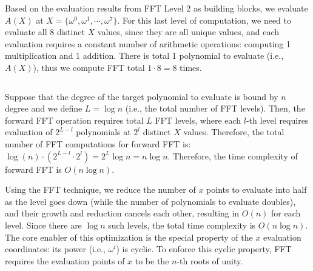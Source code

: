 $ $

 Based on the evaluation results from FFT Level 2 as building blocks, we evaluate $A(X)$ at $X = \{\omega^0, \omega^1, \cdots, \omega^7\}$. For this last level of computation, we need to evaluate all 8 distinct $X$ values, since they are all unique values, and each evaluation requires a constant number of arithmetic operations: computing 1 multiplication and 1 addition. There is total 1 polynomial to evaluate (i.e., $A(X)$), thus we compute FFT total $1 \cdot 8 = 8$ times. 

$ $

 Suppose that the degree of the target polynomial to evaluate is bound by $n$ degree and we define $L = \log n$ (i.e., the total number of FFT levels). Then, the forward FFT operation requires total $L$ FFT levels, where each $l$-th level requires evaluation of $2^{L - l}$ polynomials at $2^l$ distinct $X$ values. Therefore, the total number of FFT computations for forward FFT is: $\log (n) \cdot (2^{L - l} \cdot 2^l) = 2^L \log n = n \log n$. Therefore, the time complexity of forward FFT is $O(n \log n)$.

Using the FFT technique, we reduce the number of $x$ points to evaluate into half as the level goes down (while the number of polynomials to evaluate doubles), and their growth and reduction cancels each other, resulting in $O(n)$ for each level. Since there are $\log n$ such levels, the total time complexity is $O(n \log n)$. The core enabler of this optimization is the special property of the $x$ evaluation coordinates: its power (i.e., $\omega^i$) is cyclic. To enforce this cyclic property, FFT requires the evaluation points of $x$ to be the $n$-th roots of unity. 


